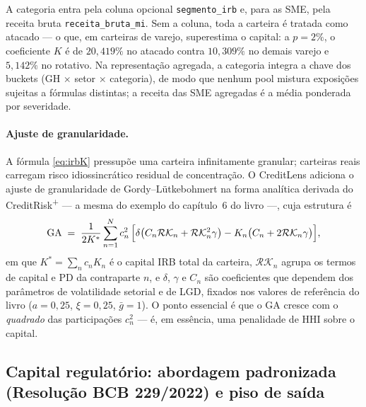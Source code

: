 \documentclass[11pt,a4paper]{article}
\begin{document}
A categoria entra pela coluna opcional \texttt{segmento\_\allowbreak irb} e, para as SME, pela receita bruta \texttt{receita\_\allowbreak bruta\_\allowbreak mi}. Sem a coluna, toda a carteira é tratada como atacado --- o que, em carteiras de varejo, superestima o capital: a $p=2\%$, o coeficiente $K$ é de $20{,}419\%$ no atacado contra $10{,}309\%$ no demais varejo e $5{,}142\%$ no rotativo. Na representação agregada, a categoria integra a chave dos buckets (GH $\times$ setor $\times$ categoria), de modo que nenhum pool mistura exposições sujeitas a fórmulas distintas; a receita das SME agregadas é a média ponderada por severidade.

\paragraph{Ajuste de granularidade.} A fórmula \eqref{eq:irbK} pressupõe uma carteira infinitamente granular; carteiras reais carregam risco idiossincrático residual de concentração. O CreditLens adiciona o ajuste de granularidade de Gordy--Lütkebohmert na forma analítica derivada do CreditRisk\textsuperscript{+} --- a mesma do exemplo do capítulo~6 do livro ---, cuja estrutura é
\begin{equation}
\mathrm{GA}\;=\;\frac{1}{2K^{*}}\sum_{n=1}^{N} c_n^2\,
\Bigl[\delta\bigl(C_n\mathcal R\mathcal K_n+\mathcal R\mathcal K_n^2\gamma\bigr)-K_n\bigl(C_n+2\mathcal R\mathcal K_n\gamma\bigr)\Bigr],
\end{equation}
em que $K^{*}=\sum_n c_n K_n$ é o capital IRB total da carteira, $\mathcal R\mathcal K_n$ agrupa os termos de capital e PD da contraparte $n$, e $\delta$, $\gamma$ e $C_n$ são coeficientes que dependem dos parâmetros de volatilidade setorial e de LGD, fixados nos valores de referência do livro ($a=0{,}25$, $\xi=0{,}25$, $\bar g=1$). O ponto essencial é que o GA cresce com o \emph{quadrado} das participações $c_n^2$ --- é, em essência, uma penalidade de HHI sobre o capital.

\subsection{Capital regulatório: abordagem padronizada (Resolução BCB 229/2022) e piso de saída}
\label{sec:cpad}
\end{document}
